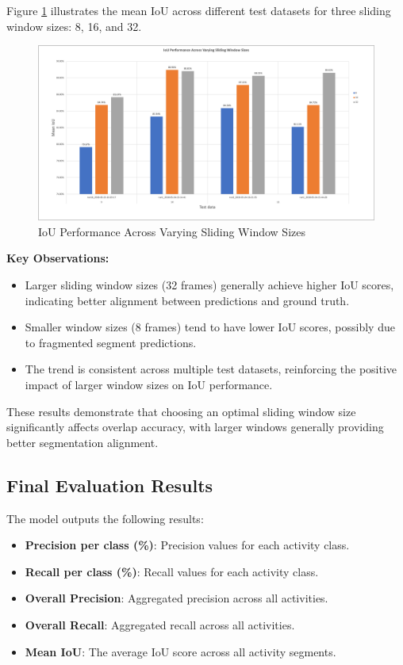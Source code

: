 \documentclass{article}
\begin{document}
Figure \ref{fig:iou-performance} illustrates the mean IoU across different test datasets for three sliding window sizes: 8, 16, and 32.

\begin{figure}[ht]
    \centering
    \includegraphics[width=0.8\linewidth]{figs/iou.png}
    \caption{IoU Performance Across Varying Sliding Window Sizes}
    \label{fig:iou-performance}
\end{figure}

\textbf{Key Observations:}
\begin{itemize}
    \item Larger sliding window sizes (32 frames) generally achieve higher IoU scores, indicating better alignment between predictions and ground truth.
    \item Smaller window sizes (8 frames) tend to have lower IoU scores, possibly due to fragmented segment predictions.
    \item The trend is consistent across multiple test datasets, reinforcing the positive impact of larger window sizes on IoU performance.
\end{itemize}

These results demonstrate that choosing an optimal sliding window size significantly affects overlap accuracy, with larger windows generally providing better segmentation alignment.

\newpage
\subsection{Final Evaluation Results}

The model outputs the following results:

\begin{itemize}
    \item \textbf{Precision per class (\%)}: Precision values for each activity class.
    \item \textbf{Recall per class (\%)}: Recall values for each activity class.
    \item \textbf{Overall Precision}: Aggregated precision across all activities.
    \item \textbf{Overall Recall}: Aggregated recall across all activities.
    \item \textbf{Mean IoU}: The average IoU score across all activity segments.
\end{itemize}
\end{document}
